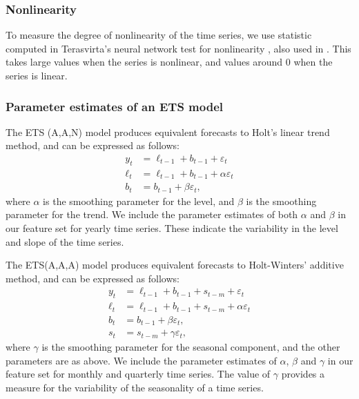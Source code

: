 \documentclass[11pt,a4paper,]{article}
\begin{document}
\hypertarget{nonlinearity}{%
\subsubsection*{Nonlinearity}\label{nonlinearity}}

To measure the degree of nonlinearity of the time series, we use statistic computed in Terasvirta's neural network test for nonlinearity \autocite{nonlintest}, also used in \textcite{wang2009rule}. This takes large values when the series is nonlinear, and values around 0 when the series is linear.

\hypertarget{parameter-estimates-of-an-ets-model}{%
\subsubsection*{Parameter estimates of an ETS model}\label{parameter-estimates-of-an-ets-model}}

The ETS (A,A,N) model \autocite{expsmooth08} produces equivalent forecasts to Holt's linear trend method, and can be expressed as follows:
\begin{align*}
  y_t    & = \ell_{t-1}+b_{t-1}+\varepsilon_t\\
  \ell_t & = \ell_{t-1}+b_{t-1}+\alpha \varepsilon_t\\
  b_t    & = b_{t-1}+\beta \varepsilon_t,
\end{align*}
where \(\alpha\) is the smoothing parameter for the level, and \(\beta\) is the smoothing parameter for the trend. We include the parameter estimates of both \(\alpha\) and \(\beta\) in our feature set for yearly time series. These indicate the variability in the level and slope of the time series.

The ETS(A,A,A) model \autocite{expsmooth08} produces equivalent forecasts to Holt-Winters' additive method, and can be expressed as follows:
\begin{align*}
  y_t    & = \ell_{t-1}+b_{t-1}+s_{t-m}+\varepsilon_t\\
  \ell_t & = \ell_{t-1}+b_{t-1}+s_{t-m}+\alpha \varepsilon_t\\
  b_t    & = b_{t-1}+\beta \varepsilon_t,\\
  s_t &= s_{t-m} + \gamma\varepsilon_t,
\end{align*}
where \(\gamma\) is the smoothing parameter for the seasonal component, and the other parameters are as above. We include the parameter estimates of \(\alpha\), \(\beta\) and \(\gamma\) in our feature set for monthly and quarterly time series. The value of \(\gamma\) provides a measure for the variability of the seasonality of a time series.
\end{document}
